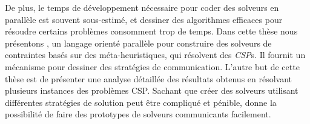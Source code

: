 De plus, le temps de d\'eveloppement n\'ecessaire pour coder des solveurs en parall\`ele est souvent sous-estim\'e, et dessiner des algorithmes efficaces pour r\'esoudre certains probl\`emes consomment trop de temps. Dans cette thèse nous présentons \posl{}, un langage orient\'e parall\`ele pour construire des solveurs de contraintes bas\'es sur des m\'eta-heuristiques, qui r\'esolvent des {\it CSP}s. Il fournit un m\'ecanisme pour dessiner des stratégies de communication. L'autre but de cette thèse est de présenter une analyse d\'etaill\'ee des r\'esultats obtenus en r\'esolvant plusieurs instances des probl\`emes CSP. Sachant que cr\'eer des solveurs utilisant diff\'erentes strat\'egies de solution peut être compliqu\'e et p\'enible, \posl{} donne la possibilit\'e de faire des prototypes de solveurs communicants facilement.